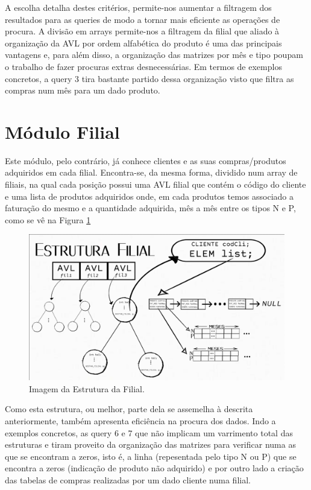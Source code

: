\documentclass[a4paper,11pt]{report}
\begin{document}
A escolha detalha destes critérios, permite-nos aumentar a filtragem dos resultados para as queries de modo a tornar mais eficiente as operações de procura. A divisão em arrays permite-nos a filtragem da filial que aliado à organização da AVL por ordem alfabética do produto é uma das principais vantagens e, para além disso, a organização das matrizes por mês e tipo poupam o trabalho de fazer procuras extras desnecessárias. Em termos de exemplos concretos, a query 3 tira bastante partido dessa organização visto que filtra as compras num mês para um dado produto.


\section{Módulo Filial}
Este módulo, pelo contrário, já conhece clientes e as suas compras/produtos adquiridos em cada filial. Encontra-se, da mesma forma, dividido num array de filiais, na qual cada posição possui uma AVL filial que contém o código do cliente e uma lista de produtos adquiridos onde, em cada produtos temos associado a faturação do mesmo e a quantidade adquirida, mês a mês entre os tipos N e P, como se vê na Figura \ref{fig4}

\begin{figure}[h!]
  \centering
  \includegraphics[scale=0.20]{Filial.png}
  \caption{Imagem da Estrutura da Filial.}
  \label{fig4}
\end{figure}

Como esta estrutura, ou melhor, parte dela se assemelha à descrita anteriormente, também apresenta eficiência na procura dos dados. Indo a exemplos concretos, as query 6 e 7 que não implicam um varrimento total das estruturas e tiram proveito da organização das matrizes para verificar numa as que se encontram a zeros, isto é, a linha (repesentada pelo tipo N ou P) que se encontra a zeros (indicação de produto não adquirido) e por outro lado a criação das tabelas de compras realizadas por um dado cliente numa filial.
\end{document}
